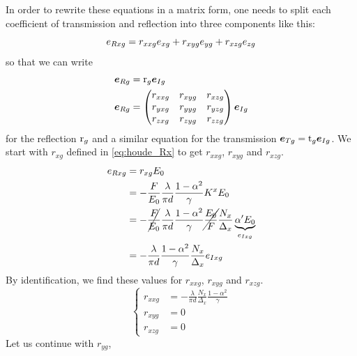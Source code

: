 In order to rewrite these equations in a matrix form, one needs to split each coefficient of transmission and reflection into three components like this:
\begin{equation}
    e_{R xg} = r_{xxg} e_{xg} + r_{xyg} e_{yg} + r_{xzg} e_{zg}
\end{equation}
so that we can write
\begin{align}
    \bm{e}_{R g} &= \mathrm{r}_g \bm{e}_{I g}
    \\
    \bm{e}_{R g} &=
    \begin{pmatrix}
        r_{xxg} & r_{xyg} & r_{xzg} \\
        r_{yxg} & r_{yyg} & r_{yzg} \\
        r_{zxg} & r_{zyg} & r_{zzg}
    \end{pmatrix}
    \bm{e}_{I g}
\end{align}
for the reflection $\mathrm{r}_g$ and a similar equation
for the transmission $\bm{e}_{T g} = \mathrm{t}_g \bm{e}_{I g}$.
We start with $r_{xg}$ defined in \cref{eq:houde_Rx} to get $r_{xxg}$, $r_{xyg}$ and $r_{xzg}$.
\begin{align*}
    e_{R xg} &= r_{xg} E_0
    \\
           &= -\frac{F}{E_0}
              \frac{\lambda}{\pi d}
              \frac{1-\alpha^2}{\gamma}
              K^x
              E_0
    \\
           &= -\cancel{\frac{F}{E_0}}
              \frac{\lambda}{\pi d}
              \frac{1-\alpha^2}{\gamma}
              \cancel{\frac{E_0}{F}}
              \frac{N_x}{\Delta_x}
              \underbrace{
                  \alpha'
                  E_0
              }_{e_{I xg}}
    \\
           &= -\frac{\lambda}{\pi d}
              \frac{1-\alpha^2}{\gamma}
              \frac{N_x}{\Delta_x}
              e_{I xg}
\end{align*}
By identification, we find these values for $r_{xxg}$, $r_{xyg}$ and $r_{xzg}$.
\begin{equation}
    \left\lbrace
    \begin{aligned}
        r_{xxg} &= -\frac{\lambda}{\pi d}
                  \frac{N_x}{\Delta_x}
                  \frac{1-\alpha^2}{\gamma}
        \\
        r_{xyg} &= 0
        \\
        r_{xzg} &= 0
    \end{aligned}
    \right.
\end{equation}
Let us continue with $r_{yg}$,
